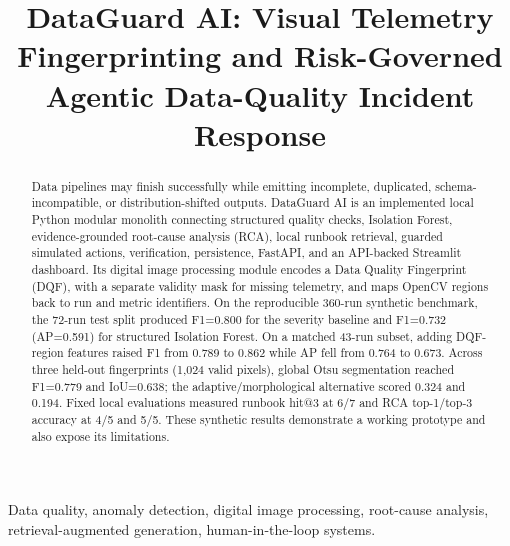 \documentclass[conference]{IEEEtran}
\begin{document}
\title{DataGuard AI: Visual Telemetry Fingerprinting and Risk-Governed Agentic Data-Quality Incident Response}

\author{
\and
{}
}

\maketitle

\begin{abstract}
Data pipelines may finish successfully while emitting incomplete, duplicated, schema-incompatible, or distribution-shifted outputs. DataGuard AI is an implemented local Python modular monolith connecting structured quality checks, Isolation Forest, evidence-grounded root-cause analysis (RCA), local runbook retrieval, guarded simulated actions, verification, persistence, FastAPI, and an API-backed Streamlit dashboard. Its digital image processing module encodes a Data Quality Fingerprint (DQF), with a separate validity mask for missing telemetry, and maps OpenCV regions back to run and metric identifiers. On the reproducible 360-run synthetic benchmark, the 72-run test split produced F1=0.800 for the severity baseline and F1=0.732 (AP=0.591) for structured Isolation Forest. On a matched 43-run subset, adding DQF-region features raised F1 from 0.789 to 0.862 while AP fell from 0.764 to 0.673. Across three held-out fingerprints (1,024 valid pixels), global Otsu segmentation reached F1=0.779 and IoU=0.638; the adaptive/morphological alternative scored 0.324 and 0.194. Fixed local evaluations measured runbook hit@3 at 6/7 and RCA top-1/top-3 accuracy at 4/5 and 5/5. These synthetic results demonstrate a working prototype and also expose its limitations.
\end{abstract}

\begin{IEEEkeywords}
Data quality, anomaly detection, digital image processing, root-cause analysis, retrieval-augmented generation, human-in-the-loop systems.
\end{IEEEkeywords}
\end{document}

